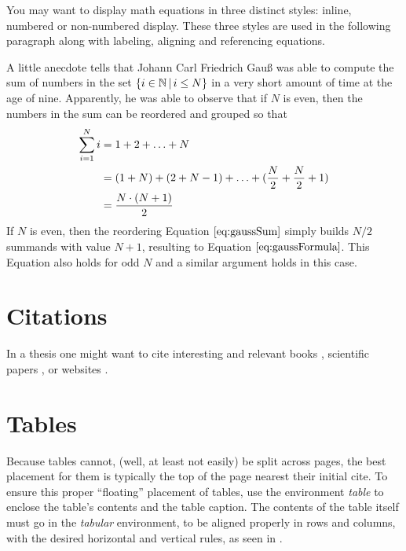 You may want to display math equations in three distinct styles:
inline, numbered or non-numbered display. These three styles are used in the
following paragraph along with labeling, aligning and referencing equations.

A little anecdote tells that Johann Carl Friedrich Gau{\ss}
was able to compute the sum of numbers in the set
$\{i \in {\mathbb N}\,|\,i \leq N\}$ in a very short amount of time at the age of nine.
Apparently, he was able to observe that if $N$ is even, then
the numbers in the sum can be reordered and grouped so that
\begin{align}
	\sum_{i=1}^N i &= 1 + 2 + \ldots + N \notag \\
	               &= (1 + N) + (2 + N-1) + \ldots + (\frac{N}{2} + \frac{N}{2}+1) \label{eq:gaussSum}\\
	               &= \frac{N\cdot (N+1)}{2}                                            \label{eq:gaussFormula}
\end{align}
If $N$ is even, then the reordering Equation $\eqref{eq:gaussSum}$ simply builds $N/2$ summands
with value $N+1$, resulting to Equation $\eqref{eq:gaussFormula}$.
This Equation also holds for odd $N$ and a similar argument holds in this case.

\section{Citations}
\label{section:citations}

In a thesis one might want to cite interesting and relevant
books \cite{Mueller07_InformationRetrieval_SPRINGER,Habets07_SpeechDereverberation},
scientific papers \cite{HerreT11_AudioObjects_AES,EdlerD09_TimeWarpedDCT},
or websites \cite{Mutopia_website}.

\section{Tables}
\label{section:tables}

Because tables cannot, (well, at least not easily) be split across pages, the best
placement for them is typically the top of the page
nearest their initial cite.  To
ensure this proper ``floating'' placement of tables, use the
environment \emph{table} to enclose the table's contents and
the table caption.  The contents of the table itself must go
in the \emph{tabular} environment, to
be aligned properly in rows and columns, with the desired
horizontal and vertical rules, as seen in .

